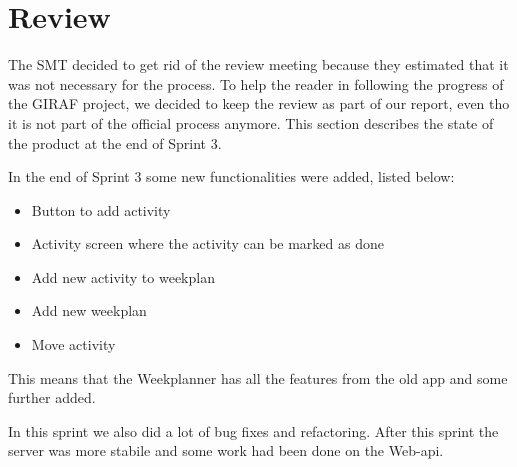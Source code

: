 \section{Review}
The \gls{SMT} decided to get rid of the review meeting because they estimated that it was not necessary for the process. To help the reader in following the progress of the GIRAF project, we decided to keep the review as part of our report, even tho it is not part of the official process anymore. This section describes the state of the product at the end of Sprint 3.

In the end of Sprint 3 some new functionalities were added, listed below:
\begin{itemize}
    \item Button to add activity
    \item Activity screen where the activity can be marked as done
    \item Add new activity to weekplan
    \item Add new weekplan
    \item Move activity
\end{itemize}

This means that the Weekplanner has all the features from the old app and some further added. 

In this sprint we also did a lot of bug fixes and refactoring. After this sprint the server was more stabile and some work had been done on the Web-api.
